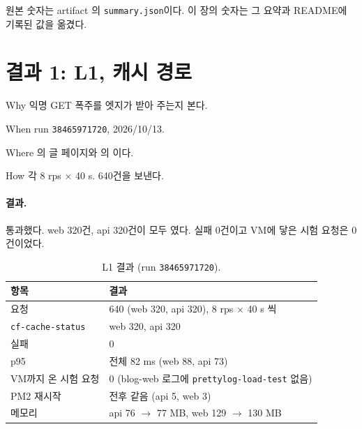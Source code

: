 원본 숫자는 artifact 의 \texttt{summary.json}이다.
이 장의 숫자는 그 요약과 README에 기록된 값을 옮겼다.

\section{결과 1: L1, 캐시 \texorpdfstring{}{HIT} 경로}\label{sec:07-result-l1}

\begin{inbrief}
  \item[Why] 익명 GET 폭주를 엣지가 받아 주는지 본다.
  \item[When] run \texttt{38465971720}, 2026/10/13.
  \item[Where] 의 글 페이지와 의 이다.
  \item[How] 각 8 rps $\times$ 40 s. 640건을 보낸다.
\end{inbrief}

\paragraph{결과.}
통과했다.
web 320건, api 320건이 모두 였다.
실패 0건이고 VM에 닿은 시험 요청은 0건이었다.

\begin{table}[H]
  \caption{L1 결과 (run \texttt{38465971720}).}\label{tab:07-l1}
  \small
  \begin{tabularx}{\linewidth}{L{3.6cm} Y}
    \toprule
    항목 & 결과 \\
    \midrule
    요청 & 640 (web 320, api 320), 8 rps $\times$ 40 s 씩 \\
    \midrule
    \texttt{cf-cache-status} & web  320, api  320 \\
    \midrule
    실패 & 0 \\
    \midrule
    p95 & 전체 82 ms (web 88, api 73) \\
    \midrule
    VM까지 온 시험 요청 & 0 (blog-web 로그에 \texttt{prettylog-load-test} 없음) \\
    \midrule
    PM2 재시작 & 전후 같음 (api 5, web 3) \\
    \midrule
    메모리 & api 76 $\rightarrow$ 77 MB, web 129 $\rightarrow$ 130 MB \\
    \bottomrule
  \end{tabularx}
\end{table}

